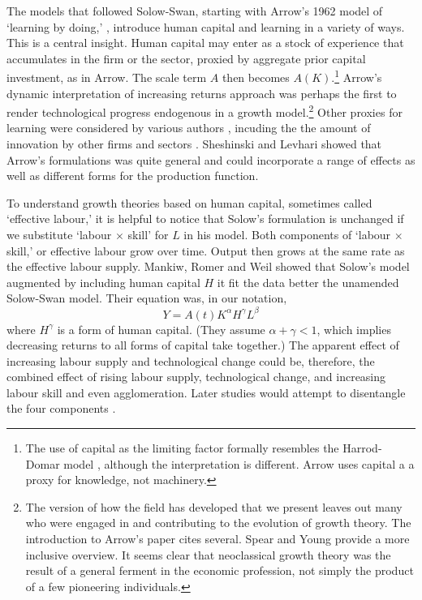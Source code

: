 The models that followed Solow-Swan, starting with Arrow's 1962 model of `learning by doing,' \cite{arrowEconomicImplicationsLearning1962a}, introduce \gls{human capital} and learning in a variety of ways. This is a central insight. Human capital may enter  as a stock of experience that accumulates in the firm or the sector, proxied by aggregate prior capital investment, as  in Arrow. The scale term $A$ then becomes $A(K)$.\footnote{The use of capital as the limiting factor formally resembles the Harrod-Domar model \cite{harrodEssayDynamicTheory1939, domarCapitalExpansionRate1946}, although the interpretation is different. Arrow uses capital a a proxy for knowledge, not machinery.} Arrow's  dynamic interpretation of increasing returns  approach was perhaps the first to  render technological progress endogenous in a growth model.\footnote{The version of how the field has developed that we present leaves out many who were engaged in and contributing to the evolution of growth theory. The introduction to  Arrow's paper cites several. Spear and Young\cite{spearMACROECONOMICDYNAMICSSURVEY2018} provide a more inclusive overview. It seems clear that neoclassical growth theory was the result of a general ferment in the economic profession, not simply the product of a few pioneering individuals.} 
Other proxies for learning were considered by various authors \cite{levhariExtensionsArrowLearning1966, sheshinskiOptimalAccumulationLearning1967}, incuding the the amount of innovation by other firms and sectors  \cite{kingEndogenousGrowthRole1989}. Sheshinski and Levhari showed that Arrow's formulations was quite general and could incorporate a range of effects as well as different forms for the production function.


To understand  growth theories based on \gls{human capital},  sometimes called `\gls{effective labour},' it is helpful to notice that Solow's formulation is unchanged if we substitute `labour $\times$ skill' for $L$ in his model. Both components of `labour $\times$  skill,' or effective labour grow over time. Output then grows at the same rate as the effective labour supply. Mankiw, Romer and Weil \cite{mankiwContributionEmpiricsEconomic1992} showed that  
Solow's model  augmented by including human capital $H$ it fit the data better the unamended Solow-Swan model. Their equation was, in our notation,   
\begin{equation*}
Y=A(t)K^\alpha H^\gamma L^\beta 
\end{equation*}
where $H^\gamma$ is a form of human capital. (They assume $\alpha+\gamma<1$, which implies decreasing returns to all forms of capital take together.) The apparent effect of increasing labour supply and technological change could be, therefore, the combined effect of rising labour supply, technological change, and increasing labour skill and even agglomeration. Later studies would attempt to disentangle the four components .


